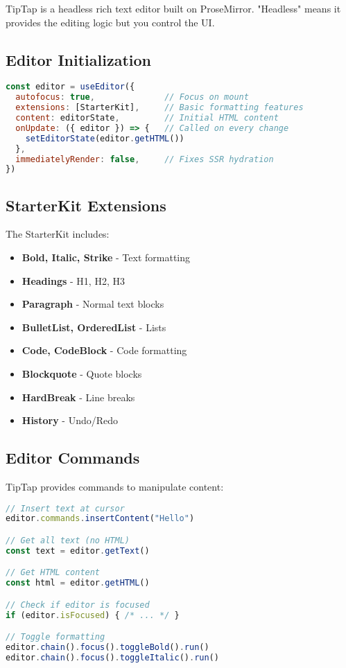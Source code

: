 \documentclass[11pt,a4paper]{article}
\begin{document}
TipTap is a headless rich text editor built on ProseMirror. "Headless" means it provides the editing logic but you control the UI.

\subsection{Editor Initialization}

\begin{lstlisting}[language=JavaScript]
const editor = useEditor({
  autofocus: true,              // Focus on mount
  extensions: [StarterKit],     // Basic formatting features
  content: editorState,         // Initial HTML content
  onUpdate: ({ editor }) => {   // Called on every change
    setEditorState(editor.getHTML())
  },
  immediatelyRender: false,     // Fixes SSR hydration
})
\end{lstlisting}

\subsection{StarterKit Extensions}

The StarterKit includes:
\begin{itemize}
    \item \textbf{Bold, Italic, Strike} - Text formatting
    \item \textbf{Headings} - H1, H2, H3
    \item \textbf{Paragraph} - Normal text blocks
    \item \textbf{BulletList, OrderedList} - Lists
    \item \textbf{Code, CodeBlock} - Code formatting
    \item \textbf{Blockquote} - Quote blocks
    \item \textbf{HardBreak} - Line breaks
    \item \textbf{History} - Undo/Redo
\end{itemize}

\subsection{Editor Commands}

TipTap provides commands to manipulate content:

\begin{lstlisting}[language=JavaScript]
// Insert text at cursor
editor.commands.insertContent("Hello")

// Get all text (no HTML)
const text = editor.getText()

// Get HTML content
const html = editor.getHTML()

// Check if editor is focused
if (editor.isFocused) { /* ... */ }

// Toggle formatting
editor.chain().focus().toggleBold().run()
editor.chain().focus().toggleItalic().run()
\end{lstlisting}
\end{document}
